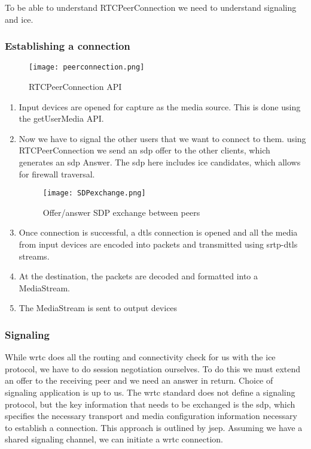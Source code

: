 To be able to understand RTCPeerConnection we need to understand signaling and \gls{ice}.

\subsubsection{Establishing a connection}

\begin{figure}[here]
\centerline{\texttt{[image: peerconnection.png]}}
\caption{RTCPeerConnection API}
\label{fig:rtcpeerconnection}
\end{figure}

\begin{enumerate}
\item Input devices are opened for capture as the media source. This is done using the getUserMedia API.
\item Now we have to signal the other users that we want to connect to them. using RTCPeerConnection we send an \gls{sdp} offer to the other clients, which generates an \gls{sdp} Answer. The \gls{sdp} here includes \gls{ice} candidates,  which allows for firewall traversal.

\begin{figure}[here]
\centerline{\texttt{[image: SDPexchange.png]}}
\caption{Offer/answer SDP exchange between peers}
\label{fig:sdp-exchange}
\end{figure}

\item Once connection is successful, a \gls{dtls} connection is opened and all the media from input devices are encoded into packets and transmitted using \gls{srtp}-\gls{dtls} streams.
\item At the destination, the packets are decoded and formatted into a MediaStream.
\item The MediaStream is sent to output devices
\end{enumerate}


\subsubsection{Signaling}
While \gls{wrtc} does all the routing and connectivity check for us with the \gls{ice} protocol, we have to do session negotiation ourselves. To do this we must extend an offer to the receiving peer and we need an answer in return. Choice of signaling application is up to us. The \gls{wrtc} standard does not define a signaling protocol, but the key information that needs to be exchanged is the \gls{sdp}, which specifies the necessary transport and media configuration information necessary to establish a connection. This approach is outlined by \gls{jsep}. Assuming we have a shared signaling channel, we can initiate a \gls{wrtc} connection.


